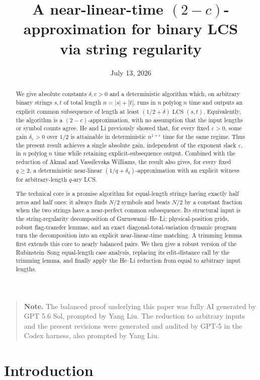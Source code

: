 \documentclass[11pt]{article}
\title{A near-linear-time $(2-c)$-approximation for binary LCS\\
via string regularity}
\author{}
\date{July 13, 2026}
\theoremstyle{remark}
\newcommand{\LCS}{\operatorname{LCS}}
\newcommand{\polylog}{\operatorname{polylog}}
\begin{document}
\maketitle

\begin{abstract}
We give absolute constants $\delta,c>0$ and a deterministic algorithm
which, on arbitrary binary strings $s,t$ of total length
$n=|s|+|t|$, runs in $n\polylog n$ time and outputs an explicit common
subsequence of length at least
$(1/2+\delta)\LCS(s,t)$.  Equivalently, the algorithm is a
$(2-c)$-approximation, with no assumption that the input lengths or symbol
counts agree.  He and Li previously showed that, for every fixed
$\varepsilon>0$, some gain $\delta_\varepsilon>0$ over $1/2$ is attainable
in deterministic $n^{1+\varepsilon}$ time for the same regime.  Thus the
present result achieves a single absolute gain, independent of the exponent
slack $\varepsilon$, in $n\polylog n$ time while retaining explicit-subsequence
output.  Combined with the reduction of Akmal and
Vassilevska Williams,
the result also gives, for every fixed $q\ge2$, a deterministic near-linear
$(1/q+\delta_q)$-approximation with an explicit witness for arbitrary-length
$q$-ary LCS.

The technical core is a promise algorithm for equal-length strings having
exactly half zeros and half ones: it always finds $N/2$ symbols and beats
$N/2$ by a constant fraction when the two strings have a near-perfect common
subsequence.  Its structural input is the string-regularity decomposition of
Guruswami--He--Li; physical-position grids, robust flag-transfer lemmas, and
an exact diagonal-total-variation dynamic program turn the decomposition into
an explicit near-linear-time matching.  A trimming lemma first extends this
core to nearly balanced pairs.  We then give a robust version of the
Rubinstein--Song equal-length case analysis, replacing its edit-distance call
by the trimming lemma, and finally apply the He--Li reduction from equal to
arbitrary input lengths.
\end{abstract}

\begin{quote}
\small\noindent\textbf{Note.} The balanced proof underlying this paper was
fully AI generated by GPT 5.6 Sol, prompted by Yang Liu.  The reduction to
arbitrary inputs and the present revisions were generated and audited by
GPT-5 in the Codex harness, also prompted by Yang Liu.
\end{quote}

\section{Introduction}
\end{document}
